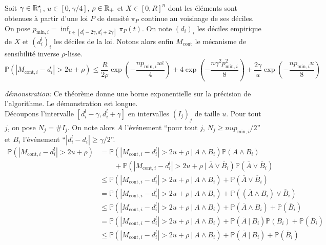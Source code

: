 \theoreme{}\\
Soit \(\gamma \in \mathbb{R}_+^\star\), \(u \in [0, \gamma/4]\), \(\rho \in \mathbb{R}_+\) et \(X \in [0,R]^n\) dont les éléments sont obtenues à partir d'une loi \(P\) de densité \(\pi_P\) continue au voisinage de ses déciles. On pose \(p_{\text{min}, i} = \inf_{t \in [d_i^l - 2\gamma, d_i^l + 2\gamma]} \pi_P(t)\). On note \((d_i)_i\) les déciles empirique de \(X\) et \((d_i^l)_i\) les déciles de la loi. Notons alors enfin \(M_{\text{cont}}\) le mécanisme de sensibilité inverse \(\rho\)-lisse.
\[
    \mathbb P\left( |M_{\text{cont}, i} - d_i| > 2u + \rho\right) \leq \dfrac{R}{2\rho}\exp\left(- \dfrac{np_{\text{min}, i}u\varepsilon}{4} \right) + 4\exp\left(- \dfrac{n\gamma^2p_{\text{min},i}^2}{8} \right) + \dfrac{2\gamma}{u}\exp\left( -\dfrac{np_{\text{min},i}u}{8} \right)
\]


\textit{démonstration:} Ce théorème donne une borne exponentielle sur la précision de l'algorithme. Le démonstration est longue.\\

Découpons l'intervalle \([d_i^l - \gamma, d_i^l + \gamma]\) en intervalles \((I_j)_j\) de taille \(u\). Pour tout \(j\), on pose \(N_j = \#I_j\). On note alors \(A\) l'événement ``pour tout \(j\), \(N_j \geq nup_{\text{min}, i}/2\)'' et \(B_i\) l'événement ``\(|d_i^l - d_i| \geq \gamma/2\)''.\\
\begin{align*}
    \mathbb P\left( |M_{\text{cont}, i} - d_i^l| > 2u + \rho \right) & = \mathbb P\left( |M_{\text{cont}, i} - d_i^l| > 2u + \rho \ | \ A \wedge B_i\right)\mathbb P\left( A \wedge B_i \right)\\
    & \quad \quad  + \mathbb P\left( |M_{\text{cont}, i} - d_i^l| > 2u + \rho \ | \ \overline A \vee \overline B_i\right) \mathbb P \left( \overline A \vee \overline B_i \right)\\
    & \leq \mathbb P\left( |M_{\text{cont}, i} - d_i^l| > 2u + \rho \ | \ A \wedge B_i\right) +   \mathbb P \left( \overline A \vee \overline B_i \right)\\
    & = \mathbb P\left( |M_{\text{cont}, i} - d_i^l| > 2u + \rho \ | \ A \wedge B_i\right) +   \mathbb P \left( (\overline A \wedge B_i) \vee \overline B_i \right)\\
    & \leq \mathbb P\left( |M_{\text{cont}, i} - d_i^l| > 2u + \rho \ | \ A \wedge B_i\right) +   \mathbb P \left( \overline A \wedge B_i\right) + \mathbb P \left( \overline B_i \right)\\
    & = \mathbb P\left( |M_{\text{cont}, i} - d_i^l| > 2u + \rho \ | \ A \wedge B_i\right) +   \mathbb P \left( \overline A \ |\ B_i\right)\mathbb P (B_i) + \mathbb P \left( \overline B_i \right)\\
    & \leq \mathbb P\left( |M_{\text{cont}, i} - d_i^l| > 2u + \rho \ | \ A \wedge B_i\right) +   \mathbb P \left( \overline A \ |\ B_i\right) + \mathbb P \left( \overline B_i \right)\\
\end{align*}

